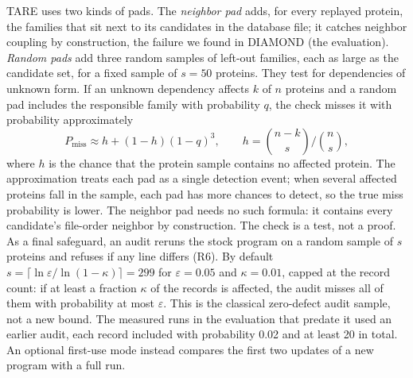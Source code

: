 \documentclass[letterpaper,twocolumn,10pt]{article}
\theoremstyle{definition}
\theoremstyle{plain}
\newcommand{\sys}{TARE\xspace}
\begin{document}
\sys uses two kinds of pads. The \textit{neighbor pad} adds, for every replayed protein, the families that sit next to
its candidates in the database file; it catches neighbor coupling by construction, the failure we found in DIAMOND
(the evaluation). \textit{Random pads} add three random samples of left\nobreakdash-out families, each as large as the
candidate set, for a fixed sample of $s=50$ proteins.
They test for dependencies of unknown form. If an unknown
dependency affects $k$ of $n$ proteins and a random pad includes the responsible family with probability $q$, the check
misses it with probability approximately
\begin{equation}
P_{\text{miss}} \approx h + (1-h)(1-q)^3, \qquad h = \binom{n-k}{s}\Big/\binom{n}{s},
\label{eq:miss}
\end{equation}
where $h$ is the chance that the protein sample contains no affected protein. The approximation treats each pad as a
single detection event; when several affected proteins fall in the sample, each pad has more chances to detect, so the
true miss probability is lower. The neighbor pad needs no such formula: it contains every candidate's file\nobreakdash-order
neighbor by construction. The check is a test, not a proof. As a final safeguard, an audit reruns the stock program on a
random sample of $s$ proteins and refuses if any line differs (R6). By default
$s = \lceil \ln\varepsilon / \ln(1-\kappa) \rceil = 299$ for $\varepsilon = 0.05$ and $\kappa = 0.01$, capped at the
record count: if at least a fraction $\kappa$ of the records is affected, the audit misses all of them with probability
at most $\varepsilon$. This is the classical zero\nobreakdash-defect audit sample, not a new bound. The measured runs in
the evaluation that predate it used an earlier audit, each record included with probability 0.02 and at least 20 in
total. An optional first\nobreakdash-use mode instead compares the first two updates of a new program with a full run.
\end{document}
